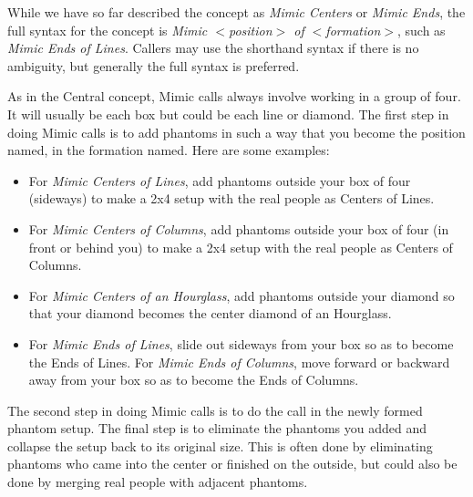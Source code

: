 \documentclass[12pt]{article}
\begin{document}
While we have so far described the concept as
\emph{Mimic Centers} or \emph{Mimic Ends}, the full syntax for the concept
is \emph{Mimic $<$position$>$ of $<$formation$>$}, such as
\emph{Mimic Ends of Lines}.
Callers may use the shorthand syntax if there is no ambiguity,
but generally the full syntax is preferred.

As in the Central concept, Mimic calls always involve working in a group 
of four.  It will usually be each box but could be each line or diamond.
The first step in doing Mimic calls is to add phantoms in such a way
that you become the position named, in the formation named.  Here are
some examples:
\begin{itemize}
\item
For \emph{Mimic Centers of Lines}, add phantoms outside
your box of four (sideways) to make a 2x4 setup with the real
people as Centers of Lines.
\item
For \emph{Mimic Centers of Columns}, add phantoms outside
your box of four (in front or behind you) to make a 2x4 setup with the real
people as Centers of Columns.
\item
For \emph{Mimic Centers of an Hourglass}, add phantoms outside
your diamond so that your diamond becomes the center diamond of an Hourglass.
\item
For \emph{Mimic Ends of Lines}, slide out sideways from your box
so as to become the Ends of Lines.
For \emph{Mimic Ends of Columns}, move forward or backward away from
your box so as to become the Ends of Columns.
\end{itemize}

The second step in doing Mimic calls is to do the call in the
newly formed phantom setup.
The final step is to eliminate the phantoms you added and
collapse the setup back to its original size.
This is often done by eliminating phantoms who came into the center
or finished on the outside, but could also be done by merging
real people with adjacent phantoms.

% 
\end{document}
